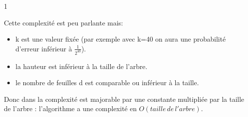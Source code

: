 1\documentclass[a4paper, 11pt,french]{article}
\begin{document}
  Cette complexité est peu parlante mais:
  \begin{itemize}
  \item k est une valeur fixée (par exemple avec k=40 on aura une probabilité d'erreur inférieur à $\frac{1}{2^{40}}$).
  \item la hauteur est inférieur à la taille de l'arbre.
  \item le nombre de feuilles d est comparable ou inférieur à la taille.
  \end{itemize}
  Donc dans la complexité est majorable par une constante multipliée par la taille de l'arbre : l'algorithme a une complexité en $O(taille\, de\,l'arbre)$.
\end{document}
